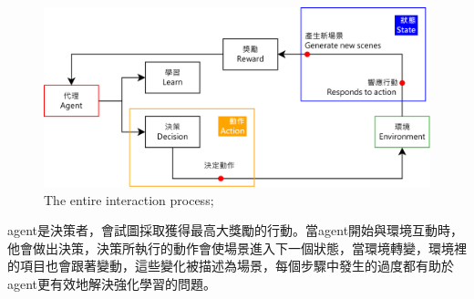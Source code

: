 \documentclass[14pt,a4paper]{report}  %
\begin{document}
\begin{figure}[hbt!]
\begin{center}
\includegraphics[width=15cm]{The_entire_interaction_process}
\caption{The entire interaction process; }%
\end{center}
\end{figure}
 agent是決策者，會試圖採取獲得最高大獎勵的行動。當agent開始與環境互動時，他會做出決策，決策所執行的動作會使場景進入下一個狀態，當環境轉變，環境裡的項目也會跟著變動，這些變化被描述為場景，每個步驟中發生的過度都有助於agent更有效地解決強化學習的問題。\\

\end{document}

